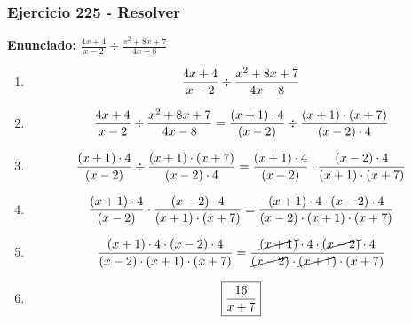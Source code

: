 \documentclass[11pt,a4paper]{article}
\newcommand{\fitmath}[1]{%
\[
\setbox0=\hbox{$\displaystyle #1$}%
\ifdim\wd0>\linewidth
\resizebox{\linewidth}{!}{$\displaystyle #1$}%
\else
#1%
\fi
\]
}
\begin{document}
\subsubsection*{Ejercicio 225 - Resolver}
\textbf{Enunciado:} $ \frac{4 x + 4}{x - 2} \div \frac{x^{2} + 8 x + 7}{4 x - 8} $\par
\begin{enumerate}[leftmargin=2em]
\item \fitmath{\frac{4 x + 4}{x - 2} \div \frac{x^{2} + 8 x + 7}{4 x - 8}}
\item \fitmath{\frac{4 x + 4}{x - 2} \div \frac{x^{2} + 8 x + 7}{4 x - 8}= \frac{\left(x + 1\right)\cdot 4}{\left(x - 2\right)} \div \frac{\left(x + 1\right)\cdot \left(x + 7\right)}{\left(x - 2\right)\cdot 4}}
\item \fitmath{\frac{\left(x + 1\right)\cdot 4}{\left(x - 2\right)}\div \frac{\left(x + 1\right)\cdot \left(x + 7\right)}{\left(x - 2\right)\cdot 4}= \frac{\left(x + 1\right)\cdot 4}{\left(x - 2\right)}\cdot \frac{\left(x - 2\right)\cdot 4}{\left(x + 1\right)\cdot \left(x + 7\right)}}
\item \fitmath{\frac{\left(x + 1\right)\cdot 4}{\left(x - 2\right)}\cdot \frac{\left(x - 2\right)\cdot 4}{\left(x + 1\right)\cdot \left(x + 7\right)}= \frac{\left(x + 1\right)\cdot 4\cdot \left(x - 2\right)\cdot 4}{\left(x - 2\right)\cdot \left(x + 1\right)\cdot \left(x + 7\right)}}
\item \fitmath{\frac{\left(x + 1\right)\cdot 4\cdot \left(x - 2\right)\cdot 4}{\left(x - 2\right)\cdot \left(x + 1\right)\cdot \left(x + 7\right)}= \frac{\cancel{\left(x + 1\right)}\cdot 4\cdot \cancel{\left(x - 2\right)}\cdot 4}{\cancel{\left(x - 2\right)}\cdot \cancel{\left(x + 1\right)}\cdot \left(x + 7\right)}}
\item \fitmath{\boxed{\frac{16}{x + 7}}}
\end{enumerate}

\vspace{0.12cm}
\end{document}
